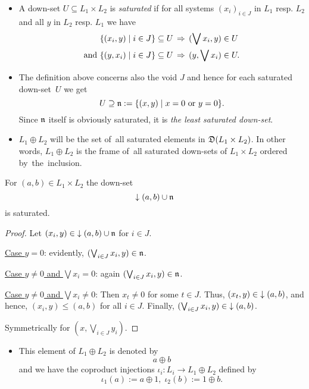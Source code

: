 \begin{itemize}
\item
{} \label{df:satur}
A down-set $U\subseteq L_1 \times L_2$ is \emph{saturated\/} if for all systems
$(x_i)_{i\in J}$ in $L_1$ resp. $L_2$ and all $y$ in $L_2$ resp. $L_1$ we have
\begin{align*}
    \{ (x_i, y) \mid i\in J \} \subseteq U \, &\Rightarrow \, (\bigvee x_i,
        y)\in U \\
    \text{and } \{ (y, x_i) \mid i\in J \} \subseteq U \, &\Rightarrow \, (y,
        \bigvee x_i)\in U.
  \end{align*}

\item The definition above concerns also the void $J$ and hence for each
saturated down-set~$U$ we get
\[
  U\supseteq \mathfrak{n} := \{ (x, y) \mid x = 0 \text{ or } y = 0 \}.
\]
Since $\mathfrak{n}$ itself is obviously saturated, it is \emph{the least saturated
down-set\/}.

\item $L_1 \oplus L_2$ will be the set of~all saturated elements in $\mathfrak{D}(L_1
\times L_2)$.
In other words, $L_1 \oplus L_2$ is the frame of~all saturated down-sets of
$L_1 \times L_2$ ordered by~the~inclusion.
\end{itemize}

\begin{prop}
For $(a, b)\in L_1 \times L_2$ the down-set
\[
  \left\downarrow\right. (a, b) \cup \mathfrak{n}
\]
is saturated.
\end{prop}
\begin{proof}
  Let $(x_i, y)\in \left\downarrow\right. (a, b) \cup \mathfrak{n}$ for $i\in J$.

  \underline{Case $y = 0$}:
  evidently, $(\bigvee_{i\in J} x_i, y) \in \mathfrak{n}$.

  \underline{Case $y \ne 0$ and $\bigvee x_i = 0$}:
  again $(\bigvee_{i\in J} x_i, y) \in \mathfrak{n}$.

  \underline{Case $y \ne 0$ and $\bigvee x_i \ne 0$}:
  Then $x_t \ne 0$ for some $t\in J$.
  Thus, $(x_t, y)\in \left\downarrow\right. (a, b)$, and hence, $(x_i, y) \le (a, b)$ for all
  $i\in J$.
  Finally, $(\bigvee_{i\in J} x_i, y) \in \left\downarrow\right. (a, b)$.

  Symmetrically for $(x, \bigvee_{i\in J} y_i)$.
\end{proof}

\begin{itemize}
\item This element of $L_1 \oplus L_2$ is denoted by
\[
  a \oplus b
\]
and we have the coproduct injections $\iota_i: L_i \to L_1 \oplus
L_2$ defined by
\[
  \iota_1(a) := a \oplus 1, \; \iota_2(b) := 1 \oplus b.
\]
\end{itemize}

